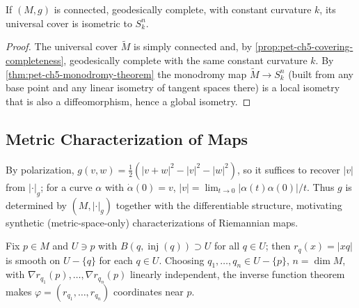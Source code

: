 \begin{corollary}
  \label{cor:pet-ch5-classification-constant-curvature}
  If $(M,g)$ is connected, geodesically complete, with constant curvature $k$, its
  universal cover is isometric to $S^n_k$.
\end{corollary}
\begin{proof}
  The universal cover $\tilde M$ is simply connected and, by
  \cref{prop:pet-ch5-covering-completeness}, geodesically complete with the same
  constant curvature $k$. By \cref{thm:pet-ch5-monodromy-theorem} the monodromy map
  $\tilde M\to S^n_k$ (built from any base point and any linear isometry of tangent
  spaces there) is a local isometry that is also a diffeomorphism, hence a global
  isometry.
\end{proof}

\subsection{Metric Characterization of Maps}

\begin{remark}
  \label{rem:pet-ch5-polarization-metric-recovery}
  By polarization, $g(v,w)=\tfrac12(|v+w|^2-|v|^2-|w|^2)$, so it suffices to
  recover $|v|$ from $|\cdot|_g$; for a curve $\alpha$ with $\dot\alpha(0)=v$,
  $|v|=\lim_{t\to0}|\alpha(t)\alpha(0)|/t$. Thus $g$ is determined by
  $(M,|\cdot|_g)$ together with the differentiable structure, motivating synthetic
  (metric-space-only) characterizations of Riemannian maps.
\end{remark}

\begin{definition}
  \label{def:pet-ch5-distance-coordinates}
  Fix $p\in M$ and $U\ni p$ with $B(q,\operatorname{inj}(q))\supset U$ for all
  $q\in U$; then $r_q(x)=|xq|$ is smooth on $U-\{q\}$ for each $q\in U$. Choosing
  $q_1,\dots,q_n\in U-\{p\}$, $n=\dim M$, with $\nabla r_{q_1}(p),\dots,\nabla
  r_{q_n}(p)$ linearly independent, the inverse function theorem makes
  $\varphi=(r_{q_1},\dots,r_{q_n})$ coordinates near $p$.
\end{definition}

